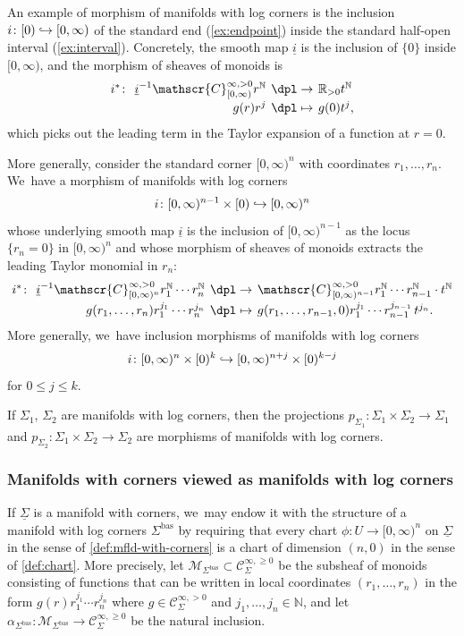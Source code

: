 \documentclass[JEP,XML,SOM,Unicode,NoFloatCountersInSection,published]{cedram}
\newcommand\mto{\mathchoice{\longmapsto}{\mapsto}{\mapsto}{\mapsto}}
\newcommand\hto{\mathrel{\lhook\joinrel\to}}
\newcommand{\mapdef}[5]{\arraycolsep2pt
\begin{array}{crcl}
#1 \colon & #2 &\dpl\to & #3 \\[3pt]
& #4 &\dpl\mto& #5
\end{array}
}
\theoremstyle{definition}
\theoremstyle{remark}
\newenvironment{example}
  {\pushQED{\qed}\renewcommand{\qedsymbol}{$\lozenge$}\examplex}
  {\popQED\endexamplex}
\newcommand{\RR}{\mathbb{R}}
\newcommand{\NN}{\mathbb{N}}
\newcommand{\model}[2]{\halfspc{#1}\times[0)^{#2}}
\newcommand{\halfspc}[1]{[0,\infty)^{#1}}
\renewcommand{\le}{\leqslant}
\renewcommand{\ge}{\geqslant}
\newcommand{\cM}{\mathscr{M}}
\newcommand{\Cinfpos}[1]{\mathscr{C}^{\infty, > 0}_{#1}}
\newcommand{\Cinfge}[1]{\mathscr{C}^{\infty, \ge 0}_{#1}}
\newcommand{\Sig}{\Sigma}
\newcommand{\uSig}{\underline{\Sigma}}
\newcommand{\bas}[1]{{#1}^{\mathrm{bas}}}
\newcommand{\Sigbas}{\bas{\Sig}}
\begin{document}
\begin{example}
An example of morphism of manifolds with log corners is the inclusion $i\colon [0)\hto [0,\infty)$ of the standard end (\autoref{ex:endpoint}) inside the standard half-open interval (\autoref{ex:interval}). Concretely, the smooth map $\underline{i}$ is the inclusion of $\{0\}$ inside $[0,\infty)$, and the morphism of sheaves of monoids is
\[
\mapdef{i^*}{\underline{i}^{-1}\Cinfpos{[0,\infty)}r^\NN}{\RR_{>0}t^\NN}
{g(r)r^j}{g(0)t^j,}
\]
which picks out the leading term in the Taylor expansion of a function at $r=0$.
\end{example}

\begin{example}
More generally, consider the standard corner $\halfspc{n}$ with coordinates $r_1,\ldots,r_n$. We~have a morphism of manifolds with log corners
\[
i\colon\halfspc{n-1}\times [0) \hto \halfspc{n}
\]
whose underlying smooth map $\underline{i}$ is the inclusion of $[0,\infty)^{n-1}$ as the locus $\{r_n=0\}$ in $[0,\infty)^n$ and whose morphism of sheaves of monoids extracts the leading Taylor monomial in $r_n$:
\[
\mapdef{i^*}{\underline{i}^{-1}\Cinfpos{\halfspc{n}} r_1^\NN\cdots r_n^\NN}{\Cinfpos{\halfspc{n-1}}r_1^\NN\cdots r_{n-1}^\NN\cdot t^\NN}
{g(r_1,\ldots,r_n)r_1^{j_1}\cdots r_n^{j_n}}{g(r_1,\ldots,r_{n-1},0)r_1^{j_1}\cdots r_{n-1}^{j_{n-1}}\, t^{j_n}.}
\]
More generally, we~have inclusion morphisms of manifolds with log corners
\[
i \colon \model{n}{k} \hto \model{n+j}{k-j}
\]
for $0 \le j \le k$.
\end{example}

\begin{example}
If $\Sig_1$, $\Sig_2$ are manifolds with log corners, then the projections $p_{\Sig_1}\colon\Sig_1\times \Sig_2\to \Sig_1$ and $p_{\Sig_2}\colon\Sig_1\times\Sig_2\to \Sig_2$ are morphisms of manifolds with log corners.
\end{example}

\subsubsection{Manifolds with corners viewed as manifolds with log corners}

If $\uSig$ is a manifold with corners, we~may endow it with the structure of a manifold with log corners $\Sigbas$ by requiring that every chart $\phi\colon U\to [0,\infty)^n$ on $\uSig$ in the sense of \autoref{def:mfld-with-corners} is a chart of dimension $(n,0)$ in the sense of \autoref{def:chart}. More precisely, let $\cM_{\Sigbas} \subset \Cinfge{\Sig}$ be the subsheaf of monoids consisting of functions that can be written in local coordinates $(r_1,\ldots,r_n)$ in the form $g(r) r_1^{j_1}\cdots r_n^{j_n}$ where $g \!\in\! \Cinfpos{\Sig}$ and \hbox{$j_1,\ldots,j_n\!\in\!\NN$}, and let $\alpha_{\Sigbas} : \cM_{\Sigbas} \to \Cinfge{\Sig}$ be the natural inclusion.
\end{document}
